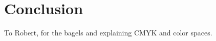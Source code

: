 \documentclass[acmsmall,screen,review,anonymous]{acmart} %
\begin{document}
\section{Conclusion}




\begin{acks}
To Robert, for the bagels and explaining CMYK and color spaces.
\end{acks}





\appendix








\end{document}
